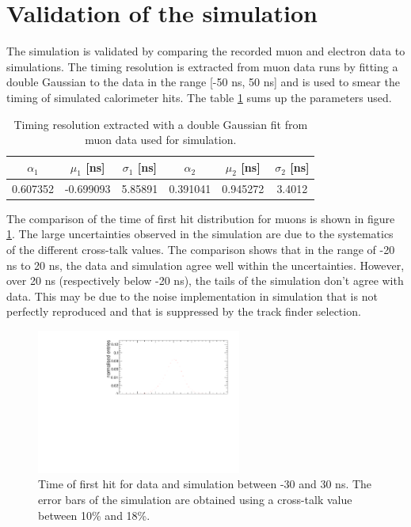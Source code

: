 \section{Validation of the simulation}

The simulation is validated by comparing the recorded muon and electron data to simulations. The timing resolution is extracted from muon data runs by fitting a double Gaussian to the data in the range [-50 ns, 50 ns] and is used to smear the timing of simulated calorimeter hits. The table \ref{table:time_res_sim} sums up the parameters used.

\begin{table}[htb!]
	\centering
	\caption{Timing resolution extracted with a double Gaussian fit from muon data used for simulation.}
	\label{table:time_res_sim}
	\begin{tabular}{@{} cccccc @{}}
		\hline
		$\alpha_{1}$ & $\mu_{1}$ [ns] & $\sigma_{1}$ [ns] & $\alpha_{2}$ & $\mu_{2}$ [ns] & $\sigma_{2}$ [ns] \\
		\hline
		0.607352 & -0.699093 & 5.85891 & 0.391041 & 0.945272 & 3.4012 \\
		\hline
	\end{tabular}
\end{table}

The comparison of the time of first hit distribution for muons is shown in figure \ref{fig:sim_data_muon}. The large uncertainties observed in the simulation are due to the systematics of the different cross-talk values. The comparison shows that in the range of -20 ns to 20 ns, the data and simulation agree well within the uncertainties. However, over 20 ns (respectively below -20 ns), the tails of the simulation don't agree with data. This may be due to the noise implementation in simulation that is not perfectly reproduced and that is suppressed by the track finder selection.

\begin{figure}[htbp!]
	\centering
	\includegraphics[width=0.6\textwidth]{../Thesis_Plots/Timing/Muons/Plots/Comparison_MokkaDD4hepData_Muons.pdf}
	\caption{Time of first hit for data and simulation between -30 and 30 ns. The error bars of the simulation are obtained using a cross-talk value between 10\% and 18\%.}
	\label{fig:sim_data_muon}
\end{figure}

